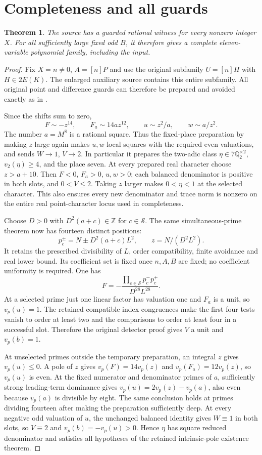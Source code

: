 \documentclass[11pt,a4paper]{article}
\newtheorem{theorem}{Theorem}[section]
\newcommand{\Q}{\mathbb Q}\newcommand{\Z}{\mathbb Z}
\begin{document}
\section{Completeness and all guards}
\begin{theorem}\label{thm:complete}
The source has a guarded rational witness for every nonzero integer $X$.
For all sufficiently large fixed odd $B$, it therefore gives a complete
eleven-variable polynomial family, including the input.
\end{theorem}
\begin{proof}
Fix $X=n\ne0$, $A=[n]P$ and use the original subfamily $U=[n]H$
with $H\in2E(K)$. The enlarged auxiliary source contains this entire
subfamily. All original point and difference guards can therefore be
prepared and avoided exactly as in \cite{Derivative,FullAux}.

Since the shifts sum to zero,
\[
 F\sim-z^{14},\qquad F_a\sim14az^{12},\qquad
 u\sim z^2/a,\qquad w\sim a/z^2.
\]
The number $a=M^8$ is a rational square. Thus the fixed-place
preparation by making $z$ large again makes $u,w$ local squares
with the required even valuations, and sends $W\to1$, $V\to2$.
In particular it prepares the two-adic class $\eta\in7\Q_2^{\times2}$,
$v_2(\eta)\ge4$, and the place seven. At every prepared real
character choose $z>a+10$. Then $F<0$, $F_a>0$, $u,w>0$;
each balanced denominator is positive in both slots, and
$0<V\le2$. Taking $z$ larger makes $0<\eta<1$ at the selected
character. This also ensures every new denominator and trace norm
is nonzero on the entire real point-character locus used in completeness.

Choose $D>0$ with $D^2(a+c)\in\Z$ for $c\in\mathcal S$. The
same simultaneous-prime theorem now has fourteen distinct positions:
\[
 p_c^\pm=N\pm D^2(a+c)L^2,\qquad z=N/(D^2L^2).
\]
It retains the prescribed divisibility of $L$, order compatibility,
finite avoidance and real lower bound. Its coefficient set is fixed
once $n,A,B$ are fixed; no coefficient uniformity is required.
One has
\[
 F=-\frac{\prod_{c\in\mathcal S}p_c^-p_c^+}{D^{28}L^{28}}.
\]
At a selected prime just one linear factor has valuation one and
$F_a$ is a unit, so $v_p(u)=1$. The retained compatible index
congruences make the first four tests vanish to order at least two
and the comparisons to order at least four in a successful slot.
Therefore the original detector proof gives $V$ a unit and $v_p(b)=1$.

At unselected primes outside the temporary preparation, an integral
$z$ gives $v_p(u)\le0$. A pole of $z$ gives
$v_p(F)=14v_p(z)$ and $v_p(F_a)=12v_p(z)$, so $v_p(u)$ is even.
At the fixed numerator and denominator primes of $a$, sufficiently
strong leading-term dominance gives
$v_p(u)=2v_p(z)-v_p(a)$, also even because $v_p(a)$ is divisible by
eight. The same conclusion holds at primes dividing fourteen after
making the preparation sufficiently deep. At every negative odd
valuation of $u$, the unchanged balanced identity gives $W\equiv1$
in both slots, so $V\equiv2$ and $v_p(b)=-v_p(u)>0$.
Hence $\eta$ has square reduced denominator and satisfies all hypotheses
of the retained intrinsic-pole existence theorem.


\end{proof}
\end{document}

